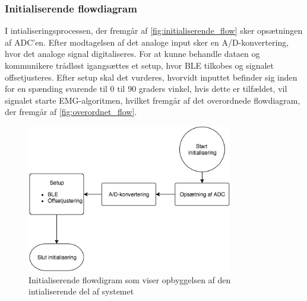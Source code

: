 \subsubsection{Initialiserende flowdiagram}
I intialiseringsprocessen, der fremgår af \autoref{fig:initialiserende_flow} sker opsætningen af ADC'en. Efter modtagelsen af det analoge input sker en A/D-konvertering, hvor det analoge signal digitaliseres. For at kunne behandle dataen og kommunikere trådløst igangsættes et setup, hvor BLE tilkobes og signalet offsetjusteres. Efter setup skal det vurderes, hvorvidt inputtet befinder sig inden for en spænding svarende til 0 til 90 graders vinkel, hvis dette er tilfældet, vil signalet starte EMG-algoritmen, hvilket fremgår af det overordnede flowdiagram, der fremgår af \autoref{fig:overordnet_flow}. 
\begin{figure}[H]
\centering
\includegraphics[width=0.8\textwidth]{figures/implementering/initialiserende_flow.png}
\caption{Initialiserende flowdigram som viser opbyggelsen af den intialiserende del af systemet}
\label{fig:initialiserende_flow}
\end{figure}

